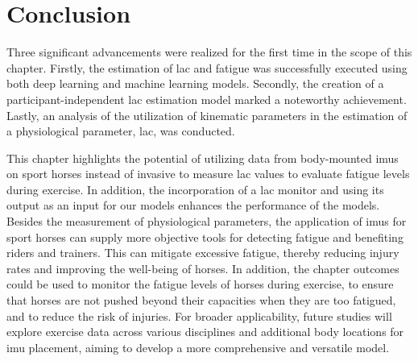 \section{Conclusion}
\label{sec:conclusion}

Three significant advancements were realized for the first time in the scope of this chapter. Firstly, the estimation of \gls{lac} and fatigue was successfully executed using both deep learning and machine learning models. Secondly, the creation of a participant-independent \gls{lac} estimation model marked a noteworthy achievement. Lastly, an analysis of the utilization of kinematic parameters in the estimation of a physiological parameter, \gls{lac}, was conducted.

This chapter highlights the potential of utilizing data from body-mounted \gls{imu}s on sport horses instead of invasive to measure \gls{lac} values to evaluate fatigue levels during exercise. In addition, the incorporation of a \gls{lac} monitor and using its output as an input for our models enhances the performance of the models. Besides the measurement of physiological parameters, the application of \gls{imu}s for sport horses can supply more objective tools for detecting fatigue and benefiting riders and trainers. This can mitigate excessive fatigue, thereby reducing injury rates and improving the well-being of horses. In addition, the chapter outcomes could be used to monitor the fatigue levels of horses during exercise, to ensure that horses are not pushed beyond their capacities when they are too fatigued, and to reduce the risk of injuries. For broader applicability, future studies will explore exercise data across various disciplines and additional body locations for \gls{imu} placement, aiming to develop a more comprehensive and versatile model.
